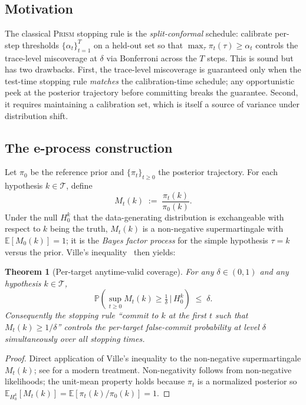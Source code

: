 \documentclass[11pt,a4paper]{article}
\newcommand{\E}{\mathbb{E}}
\newcommand{\Prob}{\mathbb{P}}
\newcommand{\Tcal}{\mathcal{T}}
\theoremstyle{plain}
\newtheorem{theorem}{Theorem}
\theoremstyle{definition}
\theoremstyle{remark}
\begin{document}
\subsection{Motivation}

The classical \textsc{Prism} stopping rule is the
\emph{split-conformal} schedule: calibrate per-step thresholds
$\{\alpha_t\}_{t=1}^T$ on a held-out set so that
$\max_\tau \pi_t(\tau) \geq \alpha_t$ controls the trace-level
miscoverage at $\delta$ via Bonferroni across the $T$ steps. This is
sound but has two drawbacks. First, the trace-level miscoverage is
guaranteed only when the test-time stopping rule \emph{matches} the
calibration-time schedule; any opportunistic peek at the posterior
trajectory before committing breaks the guarantee. Second, it
requires maintaining a calibration set, which is itself a source of
variance under distribution shift.

\subsection{The e-process construction}

Let $\pi_0$ be the reference prior and $\{\pi_t\}_{t\geq 0}$ the
posterior trajectory. For each hypothesis $k \in \Tcal$, define
\begin{equation}
\label{eq:eprocess}
M_t(k) \;:=\; \frac{\pi_t(k)}{\pi_0(k)}.
\end{equation}
Under the null $H_0^k$ that the data-generating distribution is
exchangeable with respect to $k$ being the truth, $M_t(k)$ is a
non-negative supermartingale with $\E[M_0(k)] = 1$; it is the
\emph{Bayes factor process} for the simple hypothesis $\tau{=}k$
versus the prior. Ville's inequality~\citep{ville1939etude} then
yields:

\begin{theorem}[Per-target anytime-valid coverage]
\label{thm:eprocess}
For any $\delta \in (0,1)$ and any hypothesis $k \in \Tcal$,
\begin{equation}
\Prob\!\left(\sup_{t \geq 0} M_t(k) \geq \tfrac{1}{\delta}
  \,\big|\, H_0^k\right) \;\leq\; \delta.
\end{equation}
Consequently the stopping rule ``commit to $k$ at the first $t$ such
that $M_t(k) \geq 1/\delta$'' controls the per-target false-commit
probability at level $\delta$ \emph{simultaneously over all stopping
times}.
\end{theorem}

\begin{proof}
Direct application of Ville's inequality to the non-negative
supermartingale $M_t(k)$; see \citet[Sec.~2]{howard2021timeuniform}
for a modern treatment. Non-negativity follows from non-negative
likelihoods; the unit-mean property holds because $\pi_t$ is a
normalized posterior so
$\E_{H_0^k}[M_t(k)] = \E[\pi_t(k)/\pi_0(k)] = 1$.
\end{proof}
\end{document}
